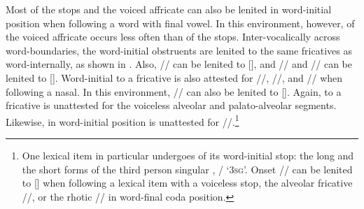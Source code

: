 Most of the stops and the voiced affricate can also be lenited in word-initial position when following a word with final vowel. In this environment, however,  of the voiced affricate occurs less often than  of the stops. Inter-vocalically across word-boundaries, the word-initial obstruents are lenited to the same fricatives as word-internally, as shown in . Also, // can be lenited to [], and // and // can be lenited to []. Word-initial  to a fricative is also attested for //, //, and // when following a nasal. In this environment, // can also be lenited to []. Again,  to a fricative is unattested for the voiceless alveolar and palato-alveolar segments. Likewise,  in word-initial position is unattested for //.\footnote{One lexical item in particular undergoes  of its word-initial stop: the long and the short forms of the third person singular , / ‘\textsc{3sg}’. Onset // can be lenited to [] when following a lexical item with a voiceless stop, the alveolar fricative //, or the rhotic // in word-final coda position.}




